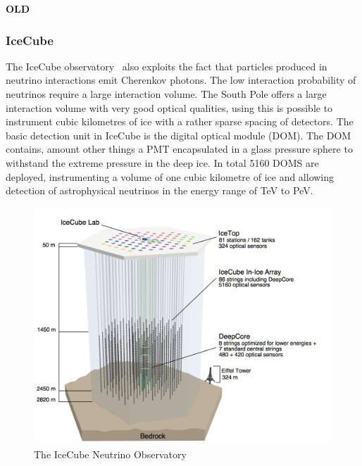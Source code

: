 \textbf{OLD}

\subsubsection{IceCube}
The IceCube observatory~\cite{43IceCube} also exploits the fact that particles produced in neutrino interactions emit Cherenkov photons. The low interaction probability of neutrinos require a large interaction volume. The South Pole offers a large interaction volume with very good optical qualities, using this is possible to instrument cubic kilometres of ice with a rather sparse spacing of detectors. The basic detection unit in IceCube is the digital optical module (DOM). The DOM contains, amount other things a PMT encapsulated in a glass pressure sphere to withstand the extreme pressure in the deep ice. In total 5160 DOMS are deployed, instrumenting a volume of one cubic kilometre of ice and allowing detection of astrophysical neutrinos in the energy range of TeV to PeV.

\begin{figure}
\centering
\includegraphics[width=.5\textwidth]{figures/IceCube.jpeg}
\caption{The IceCube Neutrino Observatory}
\end{figure}







